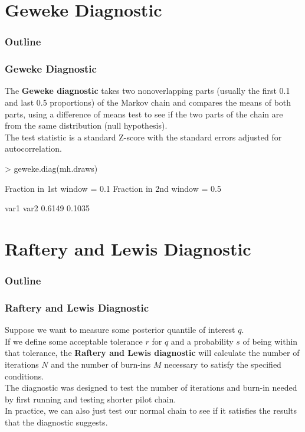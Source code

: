 \documentclass{beamer}
\begin{document}
\section{Geweke Diagnostic}

\begin{frame}
\frametitle{Outline}
\tableofcontents[currentsection]
\end{frame}

\begin{frame}[fragile]
\frametitle{Geweke Diagnostic}
\pause
The \textbf{Geweke diagnostic} takes two nonoverlapping parts (usually
the first 0.1 and last 0.5 proportions) of the
Markov chain and compares the means of both parts, using a
difference of means test to see if the two parts of the chain are from
the same distribution (null hypothesis). \\
\pause
\bigskip
The test statistic is a standard Z-score with the standard errors
adjusted for autocorrelation. \\
\pause
\bigskip
\tiny
\begin{Schunk}
\begin{Sinput}
> geweke.diag(mh.draws)
\end{Sinput}
\begin{Soutput}
Fraction in 1st window = 0.1
Fraction in 2nd window = 0.5 

  var1   var2 
0.6149 0.1035 
\end{Soutput}
\end{Schunk}
\normalsize 
\end{frame}

\section{Raftery and Lewis Diagnostic}

\begin{frame}
\frametitle{Outline}
\tableofcontents[currentsection]
\end{frame}

\begin{frame}
\frametitle{Raftery and Lewis Diagnostic}
\pause
Suppose we want to measure some posterior quantile of interest $q$.\\
\bigskip
\pause 
If we define some acceptable tolerance $r$ for $q$ and a
probability $s$ of being within that tolerance, the \textbf{Raftery
and Lewis
diagnostic} will calculate the number of iterations $N$ and the number of
burn-ins $M$ necessary to satisfy the specified conditions.\\
\bigskip
\pause
The diagnostic was designed to test the number of iterations and burn-in needed by first running and testing shorter pilot chain. \\
\bigskip
\pause
In practice, we can also just test our normal chain to see if it
satisfies the results that the diagnostic suggests.
\end{frame}
\end{document}
